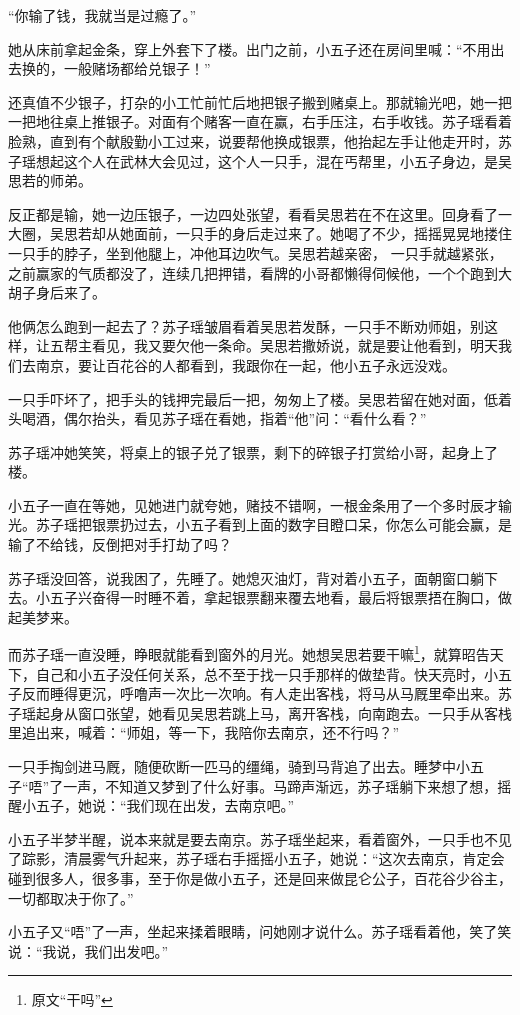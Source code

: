 “你输了钱，我就当是过瘾了。”

她从床前拿起金条，穿上外套下了楼。出门之前，小五子还在房间里喊：“不用出去换的，一般赌场都给兑银子！”

还真值不少银子，打杂的小工忙前忙后地把银子搬到赌桌上。那就输光吧，她一把一把地往桌上推银子。对面有个赌客一直在赢，右手压注，右手收钱。苏子瑶看着脸熟，直到有个献殷勤小工过来，说要帮他换成银票，他抬起左手让他走开时，苏子瑶想起这个人在武林大会见过，这个人一只手，混在丐帮里，小五子身边，是吴思若的师弟。

反正都是输，她一边压银子，一边四处张望，看看吴思若在不在这里。回身看了一大圈，吴思若却从她面前，一只手的身后走过来了。她喝了不少，摇摇晃晃地搂住一只手的脖子，坐到他腿上，冲他耳边吹气。吴思若越亲密，
一只手就越紧张，之前赢家的气质都没了，连续几把押错，看牌的小哥都懒得伺候他，一个个跑到大胡子身后来了。

他俩怎么跑到一起去了？苏子瑶皱眉看着吴思若发酥，一只手不断劝师姐，别这样，让五帮主看见，我又要欠他一条命。吴思若撒娇说，就是要让他看到，明天我们去南京，要让百花谷的人都看到，我跟你在一起，他小五子永远没戏。

一只手吓坏了，把手头的钱押完最后一把，匆匆上了楼。吴思若留在她对面，低着头喝酒，偶尔抬头，看见苏子瑶在看她，指着“他”问：“看什么看？”

苏子瑶冲她笑笑，将桌上的银子兑了银票，剩下的碎银子打赏给小哥，起身上了楼。

小五子一直在等她，见她进门就夸她，赌技不错啊，一根金条用了一个多时辰才输光。苏子瑶把银票扔过去，小五子看到上面的数字目瞪口呆，你怎么可能会赢，是输了不给钱，反倒把对手打劫了吗？

苏子瑶没回答，说我困了，先睡了。她熄灭油灯，背对着小五子，面朝窗口躺下去。小五子兴奋得一时睡不着，拿起银票翻来覆去地看，最后将银票捂在胸口，做起美梦来。

而苏子瑶一直没睡，睁眼就能看到窗外的月光。她想吴思若要干嘛\footnote{原文“干吗”}，就算昭告天下，自己和小五子没任何关系，总不至于找一只手那样的做垫背。快天亮时，小五子反而睡得更沉，呼噜声一次比一次响。有人走出客栈，将马从马厩里牵出来。苏子瑶起身从窗口张望，她看见吴思若跳上马，离开客栈，向南跑去。一只手从客栈里追出来，喊着：“师姐，等一下，我陪你去南京，还不行吗？”

一只手掏剑进马厩，随便砍断一匹马的缰绳，骑到马背追了出去。睡梦中小五子“唔”了一声，不知道又梦到了什么好事。马蹄声渐远，苏子瑶躺下来想了想，摇醒小五子，她说：“我们现在出发，去南京吧。”

小五子半梦半醒，说本来就是要去南京。苏子瑶坐起来，看着窗外，一只手也不见了踪影，清晨雾气升起来，苏子瑶右手摇摇小五子，她说：“这次去南京，肯定会碰到很多人，很多事，至于你是做小五子，还是回来做昆仑公子，百花谷少谷主，一切都取决于你了。”

小五子又“唔”了一声，坐起来揉着眼睛，问她刚才说什么。苏子瑶看着他，笑了笑说：“我说，我们出发吧。”

\newpage